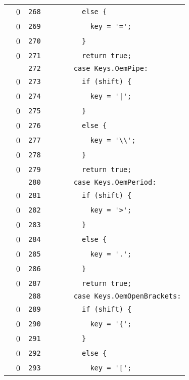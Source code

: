 \documentclass[a4paper,10pt]{article}
\begin{document}
\begin{longtable}[l]{lrrl}
\cellcolor{red} & 0 & \verb~268~ & \verb~        else {~\\
\cellcolor{red} & 0 & \verb~269~ & \verb~          key = '=';~\\
\cellcolor{red} & 0 & \verb~270~ & \verb~        }~\\
\cellcolor{red} & 0 & \verb~271~ & \verb~        return true;~\\
\cellcolor{gray} &  & \verb~272~ & \verb~      case Keys.OemPipe:~\\
\cellcolor{red} & 0 & \verb~273~ & \verb~        if (shift) {~\\
\cellcolor{red} & 0 & \verb~274~ & \verb~          key = '|';~\\
\cellcolor{red} & 0 & \verb~275~ & \verb~        }~\\
\cellcolor{red} & 0 & \verb~276~ & \verb~        else {~\\
\cellcolor{red} & 0 & \verb~277~ & \verb~          key = '\\';~\\
\cellcolor{red} & 0 & \verb~278~ & \verb~        }~\\
\cellcolor{red} & 0 & \verb~279~ & \verb~        return true;~\\
\cellcolor{gray} &  & \verb~280~ & \verb~      case Keys.OemPeriod:~\\
\cellcolor{red} & 0 & \verb~281~ & \verb~        if (shift) {~\\
\cellcolor{red} & 0 & \verb~282~ & \verb~          key = '>';~\\
\cellcolor{red} & 0 & \verb~283~ & \verb~        }~\\
\cellcolor{red} & 0 & \verb~284~ & \verb~        else {~\\
\cellcolor{red} & 0 & \verb~285~ & \verb~          key = '.';~\\
\cellcolor{red} & 0 & \verb~286~ & \verb~        }~\\
\cellcolor{red} & 0 & \verb~287~ & \verb~        return true;~\\
\cellcolor{gray} &  & \verb~288~ & \verb~      case Keys.OemOpenBrackets:~\\
\cellcolor{red} & 0 & \verb~289~ & \verb~        if (shift) {~\\
\cellcolor{red} & 0 & \verb~290~ & \verb~          key = '{';~\\
\cellcolor{red} & 0 & \verb~291~ & \verb~        }~\\
\cellcolor{red} & 0 & \verb~292~ & \verb~        else {~\\
\cellcolor{red} & 0 & \verb~293~ & \verb~          key = '[';~\\

\end{longtable}
\end{document}
